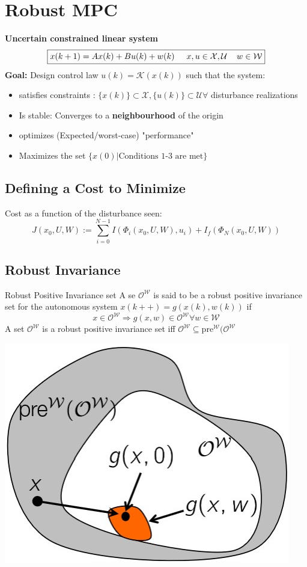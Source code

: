 \section{Robust MPC}
\textbf{Uncertain constrained linear system}
\[ \boxed{x(k+1) = A x (k) + Bu(k)+w(k)\hspace{5mm} x,u \in \mathcal{X,U} \hspace{4mm}w\in \mathcal{W}}\]
\textbf{Goal:}
Design control law $u(k)= \mathcal{K}(x(k))$ such that the system: 
\begin{itemize}
    \item satisfies constraints : $\{x(k)\} \subset \mathcal{X}, \{u(k)\} \subset \mathcal{U} \forall$ disturbance realizations 
    \item Is stable: Converges to a \textbf{neighbourhood} of the origin
    \item optimizes (Expected/worst-case) "performance"
    \item Maximizes the set $\{x(0)|\textrm{Conditions 1-3 are met}\}$
\end{itemize}
\subsection{Defining a Cost to Minimize}
    Cost as a function of the disturbance seen:
    \[J(x_0,U,W) := \sum^{N-1}_{i=0} I(\Phi_i(x_0,U,W),u_i) + I_f(\Phi_N(x_0,U,W))\]
\subsection{Robust Invariance}
    \begin{minipage}{0.54\linewidth}
        Robust Positive Invariance set
        A se $\mathcal{O}^\mathcal{W}$ is said to be a robust positive invariance set for the autonomous system $x(k++) = g(x(k), w(k))$ if \[x \in \mathcal{O}^\mathcal{W} \Rightarrow g(x,w) \in \mathcal{O}^\mathcal{W} \forall w\in \mathcal{W}\]
        A set $\mathcal{O}^\mathcal{W}$ is a robust positive invariance set iff $\mathcal{O}^\mathcal{W}\subseteq \mathrm{pre}^\mathcal{W}(\mathcal{O}^\mathcal{W}$
    \end{minipage}
    \begin{minipage}{0.45\linewidth}
        \begin{center}
            \includegraphics[width= 0.6\linewidth]{MPC_summary/Images/RPI.jpg}
        \end{center}
    \end{minipage}
